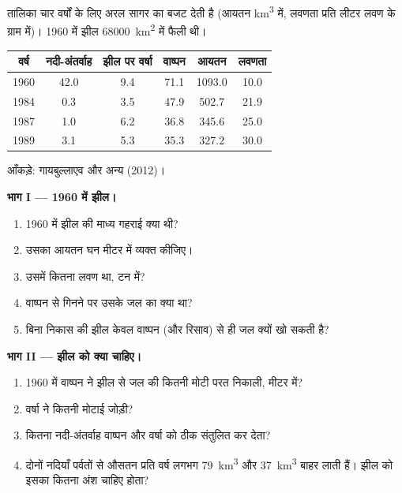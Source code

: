 \begin{problem}[{सप्ताहांत समस्या --- कोई झील कितनी तेज़ी से लुप्त होती है?}]
\label{pb:g10:freshwater-resources:1}
तालिका चार वर्षों के लिए अरल सागर का बजट देती है (आयतन
\unit{km^3} में, लवणता प्रति लीटर लवण के ग्राम में)। 1960 में झील
\qty{68000}{km^2} में फैली थी।
\begin{center}
\small
\begin{tabular}{|c|c|c|c|c|c|}
\hline
वर्ष & नदी-अंतर्वाह & झील पर वर्षा & वाष्पन & आयतन & लवणता \\ \hline
1960 & 42.0 & 9.4 & 71.1 & 1093.0 & 10.0 \\ \hline
1984 & 0.3 & 3.5 & 47.9 & 502.7 & 21.9 \\ \hline
1987 & 1.0 & 6.2 & 36.8 & 345.6 & 25.0 \\ \hline
1989 & 3.1 & 5.3 & 35.3 & 327.2 & 30.0 \\ \hline
\end{tabular}

{\small आँकड़े: गायबुल्लाएव और अन्य (2012)।}
\end{center}

\medskip
\noindent\textbf{भाग I --- 1960 में झील।}
\begin{enumerate}
  \item 1960 में झील की माध्य गहराई क्या थी?
  \item उसका आयतन घन मीटर में व्यक्त कीजिए।
  \item उसमें कितना लवण था, टन में?
  \item वाष्पन से गिनने पर उसके जल का  क्या था?
  \item बिना निकास की झील केवल वाष्पन (और
        रिसाव) से ही जल क्यों खो सकती है?
\end{enumerate}

\medskip
\noindent\textbf{भाग II --- झील को क्या चाहिए।}
\begin{enumerate}[resume]
  \item 1960 में वाष्पन ने झील से जल की कितनी मोटी परत निकाली,
        मीटर में?
  \item वर्षा ने कितनी मोटाई जोड़ी?
  \item कितना नदी-अंतर्वाह वाष्पन और वर्षा को ठीक संतुलित कर देता?
  \item दोनों नदियाँ पर्वतों से औसतन प्रति वर्ष लगभग \qty{79}{km^3} और
        \qty{37}{km^3} बाहर लाती हैं। झील को इसका कितना अंश
        चाहिए होता?
\end{enumerate}


\end{problem}
